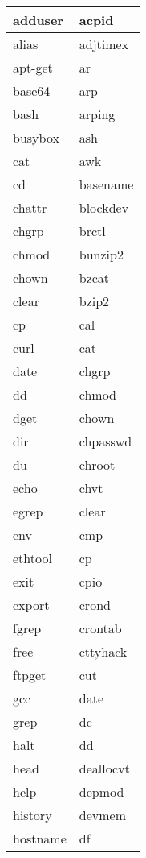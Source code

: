 \begin{longtable}{p{100mm}p{100mm}}
     adduser & acpid  \\
     \hline
     alias & adjtimex  \\
     \hline
     apt-get & ar  \\
     \hline
     base64 & arp  \\
     \hline
     bash & arping  \\
     \hline
     busybox & ash  \\
     \hline
     cat & awk  \\
     \hline
     cd & basename  \\
     \hline
     chattr & blockdev  \\
     \hline
     chgrp & brctl  \\
     \hline
     chmod & bunzip2  \\
     \hline
     chown & bzcat  \\
     \hline
     clear & bzip2  \\
     \hline
     cp & cal  \\
     \hline
     curl & cat  \\
     \hline
     date & chgrp  \\
     \hline
     dd & chmod  \\
     \hline
     dget & chown  \\
     \hline
     dir & chpasswd \\
     \hline
     du & chroot \\
     \hline
     echo & chvt \\
     \hline
     egrep & clear \\
     \hline
     env & cmp \\
     \hline
     ethtool & cp \\
     \hline
     exit & cpio \\
     \hline
     export & crond \\
     \hline
     fgrep & crontab \\
     \hline
     free & cttyhack \\
     \hline
     ftpget & cut \\
     \hline
     gcc & date \\
     \hline
     grep & dc \\
     \hline
     halt & dd \\
     \hline
     head & deallocvt \\
     \hline
     help & depmod \\
     \hline
     history & devmem \\
     \hline
     hostname & df \\

\end{longtable}
